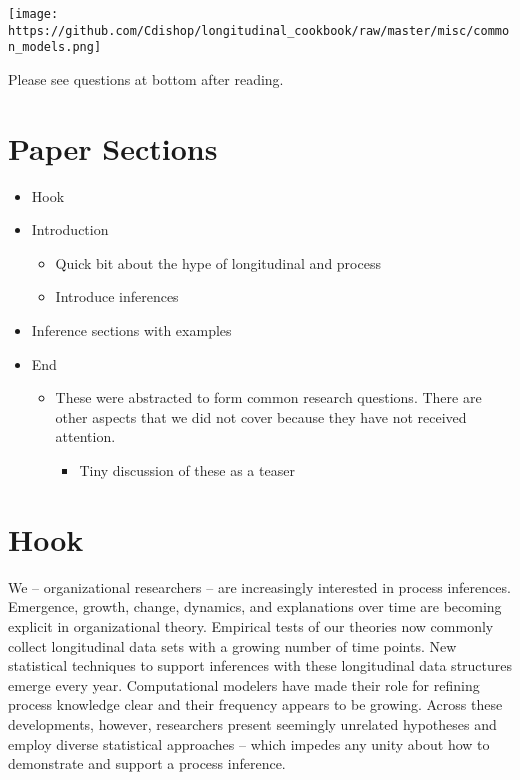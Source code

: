 \documentclass[]{article}
\title{}
\author{}
\date{}
\providecommand{\tightlist}{%
  \setlength{\itemsep}{0pt}\setlength{\parskip}{0pt}}
\begin{document}
\texttt{[image: https://github.com/Cdishop/longitudinal\_cookbook/raw/master/misc/common\_models.png]}

Please see questions at bottom after reading.

\hypertarget{paper-sections}{%
\section{Paper Sections}\label{paper-sections}}

\begin{itemize}
\tightlist
\item
  Hook
\item
  Introduction

  \begin{itemize}
  \tightlist
  \item
    Quick bit about the hype of longitudinal and process
  \item
    Introduce inferences
  \end{itemize}
\item
  Inference sections with examples
\item
  End

  \begin{itemize}
  \tightlist
  \item
    These were abstracted to form common research questions. There are
    other aspects that we did not cover because they have not received
    attention.

    \begin{itemize}
    \tightlist
    \item
      Tiny discussion of these as a teaser
    \end{itemize}
  \end{itemize}
\end{itemize}

\hypertarget{hook}{%
\section{Hook}\label{hook}}

We -- organizational researchers -- are increasingly interested in
process inferences. Emergence, growth, change, dynamics, and
explanations over time are becoming explicit in organizational theory.
Empirical tests of our theories now commonly collect longitudinal data
sets with a growing number of time points. New statistical techniques to
support inferences with these longitudinal data structures emerge every
year. Computational modelers have made their role for refining process
knowledge clear and their frequency appears to be growing. Across these
developments, however, researchers present seemingly unrelated
hypotheses and employ diverse statistical approaches -- which impedes
any unity about how to demonstrate and support a process inference.
\end{document}
